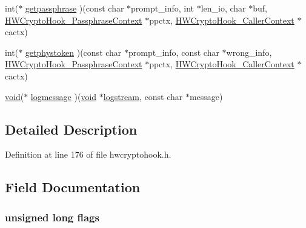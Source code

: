 \begin{DoxyCompactItemize}
int($\ast$ \hyperlink{struct_h_w_crypto_hook___init_info_a3dba8089573c851497dfa4b1da1a3843}{getpassphrase} )(const char $\ast$prompt\+\_\+info, int $\ast$len\+\_\+io, char $\ast$buf, \hyperlink{hwcryptohook_8h_a0f6a5ae07d4f5dfbf93a74f07c588c2c}{H\+W\+Crypto\+Hook\+\_\+\+Passphrase\+Context} $\ast$ppctx, \hyperlink{hwcryptohook_8h_a1a0a7d8e24f7e1f3fab7690034401466}{H\+W\+Crypto\+Hook\+\_\+\+Caller\+Context} $\ast$cactx)
\item 
int($\ast$ \hyperlink{struct_h_w_crypto_hook___init_info_a7474c7ad94f0af9db90b59c4af04b8a3}{getphystoken} )(const char $\ast$prompt\+\_\+info, const char $\ast$wrong\+\_\+info, \hyperlink{hwcryptohook_8h_a0f6a5ae07d4f5dfbf93a74f07c588c2c}{H\+W\+Crypto\+Hook\+\_\+\+Passphrase\+Context} $\ast$ppctx, \hyperlink{hwcryptohook_8h_a1a0a7d8e24f7e1f3fab7690034401466}{H\+W\+Crypto\+Hook\+\_\+\+Caller\+Context} $\ast$cactx)
\item 
\hyperlink{hw__4758__cca_8h_afad4d591c7931ff6dc5bf69c76c96aa0}{void}($\ast$ \hyperlink{struct_h_w_crypto_hook___init_info_a7f61a41fe4edc7b9c63392a1bdd2cd4b}{logmessage} )(\hyperlink{hw__4758__cca_8h_afad4d591c7931ff6dc5bf69c76c96aa0}{void} $\ast$\hyperlink{struct_h_w_crypto_hook___init_info_ad16e9ce43d8bbe64b809390c2e3f08c8}{logstream}, const char $\ast$message)
\end{DoxyCompactItemize}


\subsection{Detailed Description}


Definition at line 176 of file hwcryptohook.\+h.



\subsection{Field Documentation}
\subsubsection[{\texorpdfstring{flags}{flags}}]{\setlength{\rightskip}{0pt plus 5cm}unsigned long flags}\hypertarget{struct_h_w_crypto_hook___init_info_a9e339c2784bd040b26a5112866700bff}{}\label{struct_h_w_crypto_hook___init_info_a9e339c2784bd040b26a5112866700bff}


